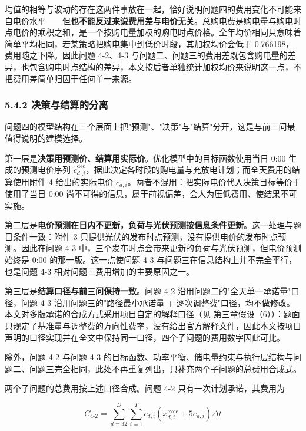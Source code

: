 \documentclass[12pt,a4paper]{ctexart}
\begin{document}
均值的相等与波动的存在这两件事放在一起，恰好说明问题四的费用变化不可能来自电价水平——但\textbf{也不能反过来说费用差与电价无关}。总购电费是购电量与购电时点电价的乘积之和，是一个按购电量加权的购电时点价格。全年均价相同只意味着简单平均相同，若某策略把购电集中到低价时段，其加权均价会低于 0.766198，费用随之下降。因此问题 4-2、4-3 与问题二、问题三的费用差既包含购电量的差异，也包含购电时点结构的差异，本文按后者单独统计加权均价来说明这一点，不把费用差简单归因于任何单一来源。

\subsubsection*{5.4.2 决策与结算的分离}

问题四的模型结构在三个层面上把"预测"、"决策"与"结算"分开，这是与前三问最值得说明的建模选择。

第一层是\textbf{决策用预测价、结算用实际价}。优化模型中的目标函数使用当日 0:00 生成的预测电价序列 $\widetilde c_{d,j}^{\mathrm{dec}}$，据此决定各时段的购电量与充放电计划；而全天费用的结算使用附件 4 给出的实际电价 $c_{d,i}$。两者不混用：把实际电价代入决策目标等价于使用了当日 0:00 尚不可得的信息，属于前视偏差，会人为压低费用、使结果不可实施。

第二层是\textbf{电价预测在日内不更新，负荷与光伏预测按信息条件更新}。这一处理与题目条件一致：附件 3 只提供光伏的发布时点预测，没有提供电价的发布时点预测。因此在问题 4-3 中，三个发布时点会带来更新的负荷与光伏预测，但电价预测始终是 0:00 的那一版。这一点使问题 4-3 与问题三在信息结构上并不完全平行，也是问题 4-3 相对问题三费用增加的主要原因之一。

第三层是\textbf{结算口径与前三问保持一致}。问题 4-2 沿用问题二的"全天单一承诺量"口径，问题 4-3 沿用问题三的"路径最小承诺量 + 逐次调整费"口径，均不做修改。本文对多版承诺的合成方式采用项目自定的解释口径（见 第三章假设（6））：题面只规定了基准量与调整费的方向性费率，没有给出官方解释文件，因此本文按项目声明的口径实现并在全文中保持同一口径，四个子问题的费用数字因此可比。

除外，问题 4-2 与问题 4-3 的目标函数、功率平衡、储电量约束与执行层结构与问题二、问题三完全相同，此处不再重复列出，只补充两个子问题的总费用合成式。

两个子问题的总费用按上述口径合成。问题 4-2 只有一次计划承诺，其费用为

\begin{equation}
C_{4\text{-}2}=\sum_{d=32}^{D}\sum_{i=1}^{T}c_{d,i}\left(x_{d,i}^{\mathrm{exec}}+5e_{d,i}\right)\Delta t
\end{equation}
\end{document}
